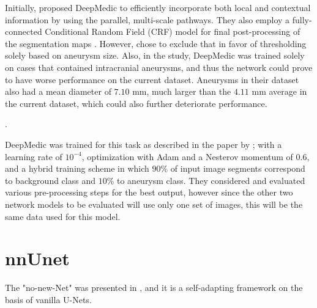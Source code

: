 
Initially, \citeauthor{Kamnitsas2017} proposed DeepMedic to efficiently incorporate both local and contextual information by using the parallel, multi-scale pathways. They also employ a fully-connected Conditional Random Field (CRF) model for final post-processing of the segmentation maps \cite{Krahenbuhl2012}. However, \citeauthor{Sichermann2019} chose to exclude that in favor of thresholding solely based on aneurysm size. Also, in the study, DeepMedic was trained solely on cases that contained intracranial aneurysms, and thus the network could prove to have worse performance on the current dataset. Aneurysms in their dataset also had a mean diameter of $7.10$ mm, much larger than the $4.11$ mm average in the current dataset, which could also further deteriorate performance. 

.

DeepMedic was trained for this task as described in the paper by \citeauthor{Sichermann2019}; with a learning rate of $10^{-4}$, optimization with Adam and a Nesterov momentum of $0.6$, and a hybrid training scheme in which $90\%$ of input image segments correspond to background class and $10\%$ to aneurysm class. They considered and evaluated various pre-processing steps for the best output, however since the other two network models to be evaluated will use only one set of images, this will be the same data used for this model. 



\section{nnUnet}
The "no-new-Net" was presented in \citeyear{nnUnet}, and it is a self-adapting framework on the basis of vanilla U-Nets.


